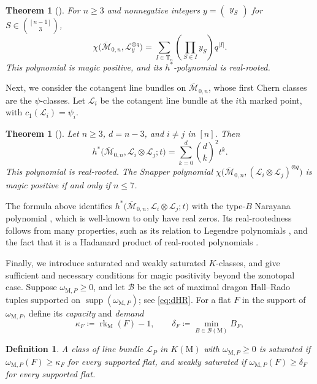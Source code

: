 \documentclass[11pt,a4paper,reqno]{amsart}
\theoremstyle{results}
\theoremstyle{definitions}
\newtheorem{definition}[thm]{Definition}
\newcommand{\rk}{\operatorname{rk}}
\newcommand{\M}{\mathrm{M}}
\newtheorem{theorem}[thm]{Theorem}
\DeclareMathOperator{\supp}{supp}
\newcommand{\hstar}{h^{*}}
\newcommand{\cL}{\mathcal{L}}
\newcommand{\DT}{\mathrm{T}}      %
\newcommand{\capa}{\kappa}   %
\newcommand{\dem}{\delta}    %
\newcommand{\Mbar}{\overline{\mathcal M}}
\begin{document}
\begin{theorem}[]\label{thm:main-m0n}
  For $n\geqslant3$ and nonnegative integers $y = \begin{pmatrix}y_S \end{pmatrix}$ for $S \in \binom{[n-1]}{3}$,
  \[
    \chi\big(\Mbar_{0,n},\cL_y^{\otimes q}\big)
    =\sum_{I\in\DT_n}\left(\prod_{S\in I}y_S\right)q^{|I|}.
  \]
  This polynomial is magic positive, and its $\hstar$-polynomial is real-rooted.
\end{theorem}

Next, we consider the cotangent line bundles on $\Mbar_{0, n}$, whose first Chern classes are the $\psi$-classes. Let
$\cL_i$ be the cotangent line bundle at the $i$th marked point, with
$c_1(\cL_i)=\psi_i$.

\begin{theorem}[]\label{thm:main-psi}
  Let $n\geqslant3$, $d=n-3$, and $i\ne j$ in $[n]$. Then
  \[
    \hstar\big(\Mbar_{0,n},\cL_i\otimes\cL_j;t\big)
    =\sum_{k=0}^d\binom dk^2t^k.
  \]
  This polynomial is real-rooted. The Snapper polynomial
  $\chi\big(\Mbar_{0,n},(\cL_i\otimes\cL_j)^{\otimes q}\big)$ is magic
  positive if and only if $n\leqslant7$.
\end{theorem}

The formula above identifies $\hstar\big(\Mbar_{0,n},\cL_i\otimes\cL_j;t\big)$ with the type-$B$ Narayana polynomial
\cite{reiner1997noncrossing,simion2003type}, which is well-known to only have real zeros. 
Its real-rootedness follows from many properties, such as its relation to Legendre polynomials \cite{szego1975orthogonal}, and the fact that it is a Hadamard product of real-rooted polynomials \cite{wagner1992total}.

Finally, we introduce saturated and weakly saturated $K$-classes, and give sufficient and necessary conditions for magic positivity
beyond the zonotopal case. Suppose $\omega_{\M, P}\geqslant0$, and let
$\mathcal B$ be the set of maximal dragon Hall--Rado tuples supported on
$\supp(\omega_{\M, P})$; see \eqref{eq:dHR}. For a flat $F$ in the support of $\omega_{\M, P}$, define its
\emph{capacity} and \emph{demand}
\[
  \capa_F \coloneqq \rk_{\M}(F)-1,\qquad \dem_F \coloneqq \min_{B \in\mathcal{B}(\M)} B_F, 
\]
\begin{definition}\label{def:classes}
  A class of line bundle $\cL_P$ in $K(\M)$ with $\omega_{\M, P}\geqslant0$ is \emph{saturated} if
  $\omega_{\M, P}(F)\geqslant\capa_F$ for every supported flat, and
  \emph{weakly saturated} if $\omega_{\M, P}(F)\geqslant\dem_F$ for every supported
  flat.
\end{definition}
\end{document}
